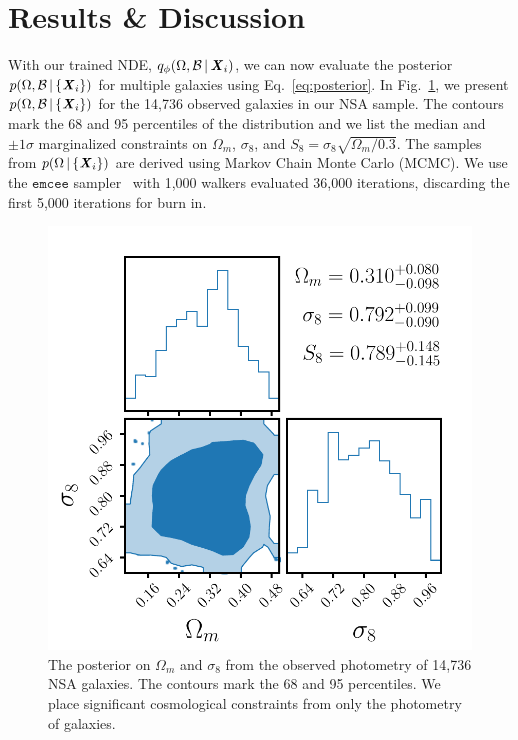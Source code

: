 \section{Results \& Discussion} \label{sec:results}
With our trained NDE, $q_{\phi}(\Omega, \mathcal{B}\,|\, {\textbf{\textit{X}}_i})$, we can
now evaluate the posterior $p(\Omega, \mathcal{B}\,|\,\{\textbf{\textit{X}}_i\})$ for
multiple galaxies using Eq.~\ref{eq:posterior}. 
In Fig.~\ref{fig:p_omega_x}, we present 
$p(\Omega, \mathcal{B}\,|\,\{\textbf{\textit{X}}_i\})$ for the 14,736 observed galaxies in
our NSA sample.
The contours mark the 68 and 95 percentiles of the distribution and we list the
median and $\pm1\sigma$ marginalized constraints on $\Omega_m$, $\sigma_8$, and
$S_8 = \sigma_8\sqrt{\Omega_m/0.3}$. 
The samples from $p(\Omega\,|\,\{\textbf{\textit{X}}_i\})$ are derived using Markov Chain
Monte Carlo (MCMC). 
We use the $\mathtt{emcee}$ sampler~\citep{foreman-mackey2013} with 1,000
walkers evaluated 36,000 iterations, discarding the first 5,000 iterations for
burn in.

\begin{figure}[ht]
\begin{center}
    \centerline{\includegraphics[width=0.9\columnwidth]{figs/p_oms8_x.pdf}}
    \caption{The posterior on $\Omega_m$ and $\sigma_8$ from the observed
    photometry of 14,736 NSA galaxies.
    The contours mark the 68 and 95 percentiles. 
    We place significant cosmological constraints from only the photometry of 
    galaxies. 
    }\label{fig:p_omega_x}
\end{center}
\vskip -0.2in
\end{figure}

